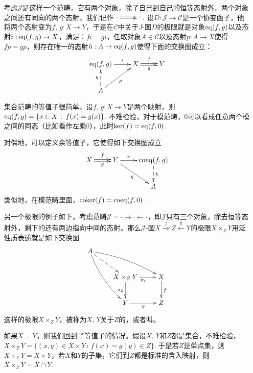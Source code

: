 \begin{para}[等值子与余等值子]
考虑$\mathcal{J}$是这样一个范畴，它有两个对象，除了自己到自己的恒等态射外，两个对象之间还有同向的两个态射，我们记作$\xymatrix{\cdot\ar@<0.3ex>[r] \ar@<-0.3ex>[r]&\cdot}$. 设$D:\mathcal{J}\to\mathcal{C}$是一个协变函子，他将两个态射变为$f$, $g:X\to Y$，于是在$\mathcal{C}$中关于$J$-图$D$的极限就是对象$\operatorname{eq}(f,g)$以及态射$i:\operatorname{eq}(f,g)\to X$，满足：$fi=gi$，任取对象$A\in \mathcal{C}$以及态射$p:A\to X$使得$fp=gp$，则存在唯一的态射$h:A\to \operatorname{eq}(f,g)$使得下面的交换图成立：
\[
\begin{xy}
	\xymatrix{
		\eq(f,g)\ar[r]^-{i}&X\ar@<0.3ex>[r]^-{f} \ar@<-0.3ex>[r]_-{g}&Y\\
		A\ar@{-->}[u]^-{h}\ar[ur]_-{p}
	}
\end{xy}
\]

集合范畴的等值子很简单，设$f$, $g:X\to Y$是两个映射，则$\operatorname{eq}(f,g)=\{x\in X\,:\, f(x)=g(x)\}$. 不难检验，对于模范畴，$0$可以看成任意两个模之间的同态（比如看作左乘$0$），此时$\ker(f)=\operatorname{eq}(f,0)$. 

对偶地，可以定义余等值子，它使得如下交换图成立
\[
\begin{xy}
	\xymatrix{
		X\ar@<0.3ex>[r]^-{f} \ar@<-0.3ex>[r]_-{g}&Y\ar[r]^-{\pi}\ar[dr]_-{q}&\mathrm{coeq}(f,g)\ar@{-->}[d]^-{h}\\
		&&A
	}
\end{xy}
\]
类似地，在模范畴里面，$\operatorname{coker}(f)=\mathrm{coeq}(f,0)$.
\end{para}

\begin{para}[纤维积]
另一个极限的例子如下。考虑范畴$\mathcal{J}=\cdot \to \cdot \leftarrow \cdot$，即$\mathcal{J}$只有三个对象，除去恒等态射外，剩下的还有两边指向中间的态射。那么$\mathcal{J}$-图$X\xrightarrow{f} Z \xleftarrow{g} Y$的极限$X\times_Z Y$用泛性质表述就是如下交换图
\[
\begin{xy}
	\xymatrix{
		A\ar@/_/[rdd]\ar@/^/[drr]\ar@{-->}[dr]&&\\
		&X\times_Z Y\ar[d]_{\pi_2}\ar[r]_{\pi_1}&X\ar[d]^f\\
		&Y\ar[r]_g&Z
	}
\end{xy}
\]
这样的极限$X\times_Z Y$，被称为$X$, $Y$关于$Z$的，或者叫。

如果$X=Y$，则我们回到了等值子的情况。假设$X$, $Y$和$Z$都是集合，不难检验，$X\times_Z Y=\{(x,y)\in X \times Y\,:\,f(x)=g(y)\in Z\}$. 于是若$Z$是单点集，则$X\times_Z Y=X\times Y$，若$X$和$Y$的子集，它们到$Z$都是标准的含入映射，则$X\times_Z Y=X\cap Y$.
\end{para}

